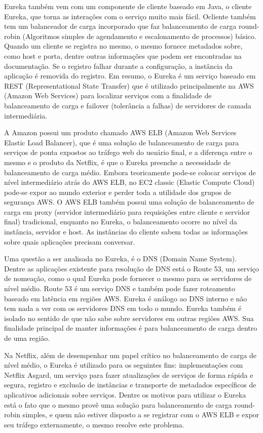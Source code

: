 Eureka também vem com um componente de cliente baseado em Java, o cliente Eureka, que torna as interações com o serviço muito mais fácil. Ocliente também tem um balanceador de carga incorporado que faz balanceamento de carga round-robin (Algoritmos simples de agendamento e escalonamento de processos) básico. Quando um cliente se registra no mesmo, o mesmo fornece metadados sobre, como host e porta, dentre outras informações que podem ser encontradas na documentação. Se o registro falhar durante a configuração, a instância da aplicação é removida do registro. Em resumo, o Eureka é um serviço baseado em REST (Representational State Transfer) que é utilizado principalmente na AWS (Amazon Web Services) para localizar serviços com a finalidade de balanceamento de carga e failover (tolerância a falhas) de servidores de camada intermediária. 

A Amazon possui um produto chamado AWS ELB (Amazon Web Services Elastic Load Balancer), que é uma solução de balanceamento de carga para serviços de ponta expostos ao tráfego web do usuário final, e a diferença entre o mesmo e o produto da Netflix, é que o Eureka preenche a necessidade de balanceamento de carga médio. Embora teoricamente pode-se colocar serviços de nível intermediário atrás do AWS ELB, no EC2 classic (Elastic Compute Cloud) pode-se expor ao mundo exterior e perder toda a utilidade dos grupos de segurança AWS. O AWS ELB  também possui uma solução de balanceamento de carga em proxy (servidor intermediário para requisições entre cliente e servidor final) tradicional, enquanto no Eureka, o balanceamento ocorre no nível da instância, servidor e host. As instâncias do cliente sabem todas as informações sobre quais aplicações precisam conversar.

Uma questão a ser analisada no Eureka, é o DNS (Domain Name System). Dentre as aplicações existente para resolução de DNS está o Route 53, um serviço de nomeação, como o qual Eureka pode fornecer o mesmo para os servidores de nível médio. Route 53 é um serviço DNS e também pode fazer roteamento baseado em latência em regiões AWS. Eureka é análogo ao DNS interno e não tem nada a ver com os servidores DNS em todo o mundo. Eureka também é isolado no sentido de que não sabe sobre servidores em outras regiões AWS. Sua finalidade principal de manter informações é para balanceamento de carga dentro de uma região.

Na Netflix, além de desempenhar um papel crítico no balanceamento de carga de nível médio, o Eureka é utilizado para os seguintes fins: implementações com Netflix Asgard, um serviço para fazer atualizações de serviços de forma rápida e segura, registro e exclusão de instâncias e transporte de metadados específicos de aplicativos adicionais sobre serviços. Dentre os motivos para utilizar o Eureka está o fato que o mesmo provê uma solução para balanceamento de carga round-robin simples, e quem não estiver disposto a se registrar com o AWS ELB e expor seu tráfego externamente, o mesmo resolve este problema.

